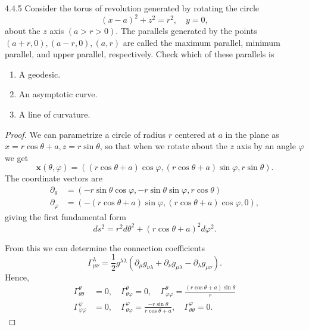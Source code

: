 \documentclass[11pt]{article}
\begin{document}
\begin{problem}{4.4.5}
  Consider the torus of revolution generated by rotating the circle
  \begin{equation}
  \label{eq:7}
  (x-a)^2 + z^2 = r^2, \quad y = 0,
\end{equation}
about the \( z \) axis \( (a > r > 0) \).
The parallels generated by the points \( (a+r,0), (a-r,0), (a,r) \) are called the maximum parallel, minimum parallel, and upper parallel, respectively.
Check which of these parallels is
\begin{enumerate}[label=\alph*.]
  \item A geodesic.
  \item An asymptotic curve.
  \item A line of curvature.
\end{enumerate}
\begin{proof}
  We can parametrize a circle of radius \( r \) centered at \( a \) in the plane as \( x = r\cos\theta + a, z = r\sin\theta \), so that when we rotate about the \( z \) axis by an angle \( \varphi \) we get
  \begin{equation}
  \label{eq:9}
  \mathbf{x}(\theta,\varphi) = ((r\cos\theta + a)\cos\varphi, (r\cos\theta + a)\sin\varphi, r\sin\theta).
\end{equation}
The coordinate vectors are
\begin{equation}
\label{eq:10}
\begin{aligned}
  \partial_{\theta} &= (-r\sin\theta\cos\varphi, -r\sin\theta\sin\varphi, r\cos\theta) \\
  \partial_{\varphi} &= (-(r\cos\theta + a)\sin\varphi, (r\cos\theta + a)\cos\varphi, 0),
\end{aligned}
\end{equation}
giving the first fundamental form
\begin{equation}
\label{eq:11}
ds^2 = r^2d\theta^2 + (r\cos\theta + a)^2d\varphi^2.
\end{equation}

From this we can determine the connection coefficients
\begin{equation}
\label{eq:12}
\Gamma_{\mu\nu}^{\lambda} = \frac{1}{2}g^{\lambda\lambda} \left( \partial_{\mu}g_{\nu\lambda} + \partial_{\nu}g_{\mu\lambda} - \partial_{\lambda}g_{\mu\nu} \right).
\end{equation}
Hence,
\begin{equation}
\begin{aligned}
  \Gamma_{\theta\theta}^{\theta} &= 0, \quad \Gamma_{\theta\varphi}^{\theta} = 0, \quad \Gamma_{\varphi\varphi}^{\theta} = \frac{(r\cos\theta + a)\sin\theta}{r} \\
  \Gamma_{\varphi\varphi}^{\varphi} &=0, \quad \Gamma_{\theta\varphi}^{\varphi} = \frac{-r\sin\theta}{r\cos\theta + a}, \quad \Gamma_{\theta\theta}^{\varphi} = 0.
\end{aligned}
\end{equation}


\end{proof}
\end{problem}
\end{document}
